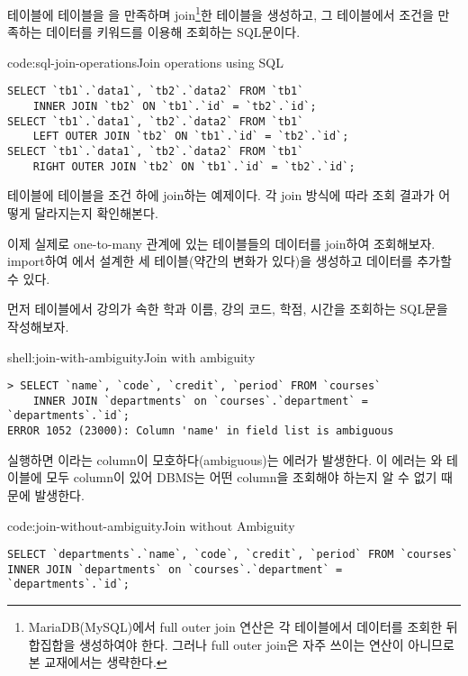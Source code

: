 \은  테이블에  테이블을 을 만족하며 join\footnote{MariaDB(MySQL)에서 full outer join 연산은 각 테이블에서 데이터를 조회한 뒤 합집합을 생성하여야 한다. 그러나 full outer join은 자주 쓰이는 연산이 아니므로 본 교재에서는 생략한다.}한 테이블을 생성하고, 그 테이블에서  조건을 만족하는 데이터를  키워드를 이용해 조회하는 SQL문이다.

\begin{code}{code:sql-join-operations}{Join operations using SQL}
\begin{verbatim}
SELECT `tb1`.`data1`, `tb2`.`data2` FROM `tb1`
    INNER JOIN `tb2` ON `tb1`.`id` = `tb2`.`id`;
SELECT `tb1`.`data1`, `tb2`.`data2` FROM `tb1`
    LEFT OUTER JOIN `tb2` ON `tb1`.`id` = `tb2`.`id`;
SELECT `tb1`.`data1`, `tb2`.`data2` FROM `tb1`
    RIGHT OUTER JOIN `tb2` ON `tb1`.`id` = `tb2`.`id`;
\end{verbatim}
\end{code}

\는  테이블에  테이블을  조건 하에 join하는 예제이다. 각 join 방식에 따라 조회 결과가 어떻게 달라지는지 확인해본다.

이제 실제로 one-to-many 관계에 있는 테이블들의 데이터를 join하여 조회해보자. \을 import하여 에서 설계한 세 테이블(약간의 변화가 있다)을 생성하고 데이터를 추가할 수 있다.

먼저  테이블에서 강의가 속한 학과 이름, 강의 코드, 학점, 시간을 조회하는 SQL문을 작성해보자.

\begin{shell}{shell:join-with-ambiguity}{Join with ambiguity}
\begin{verbatim}
> SELECT `name`, `code`, `credit`, `period` FROM `courses`
    INNER JOIN `departments` on `courses`.`department` = `departments`.`id`;
ERROR 1052 (23000): Column 'name' in field list is ambiguous
\end{verbatim}
\end{shell}

\를 실행하면 이라는 column이 모호하다(ambiguous)는 에러가 발생한다. 이 에러는 와  테이블에 모두  column이 있어 DBMS는 어떤  column을 조회해야 하는지 알 수 없기 때문에 발생한다.

\begin{code}{code:join-without-ambiguity}{Join without Ambiguity}
\begin{verbatim}
SELECT `departments`.`name`, `code`, `credit`, `period` FROM `courses`
INNER JOIN `departments` on `courses`.`department` = `departments`.`id`;
\end{verbatim}
\end{code}


